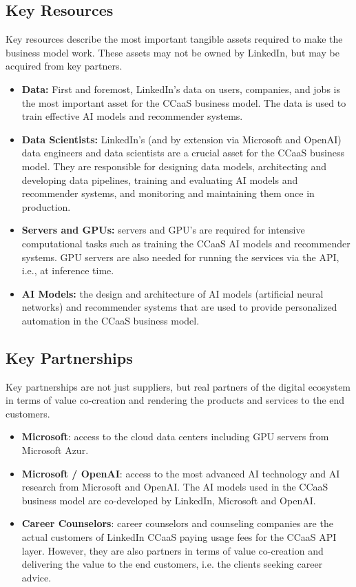 \subsection{Key Resources}

Key resources describe the most important tangible assets required to make the business model work. These
assets may not be owned by LinkedIn, but may be acquired from key partners.

\begin{itemize}
        \item \textbf{Data:} First and foremost, LinkedIn's data on users, companies, and jobs is the most
                important asset for the CCaaS business model. The data is used to train effective AI models
                and recommender systems.
        \item \textbf{Data Scientists:} LinkedIn's (and by extension via Microsoft and OpenAI) data engineers 
                and data scientists are a crucial asset for the CCaaS business model. They are responsible for
                designing data models, architecting and developing data pipelines, training and evaluating
                AI models and recommender systems, and monitoring and maintaining them once in production.
        \item \textbf{Servers and GPUs:} servers and GPU's are required for intensive computational tasks 
                such as training the CCaaS AI models and recommender systems. GPU servers are also needed 
                for running the services via the API, i.e., at inference time.
        \item \textbf{AI Models:} the design and architecture of AI models (artificial neural networks) and
                recommender systems that are used to provide personalized automation in the CCaaS business model.
\end{itemize}

\subsection{Key Partnerships}

Key partnerships are not just suppliers, but real partners of the digital ecosystem in terms of value
co-creation and rendering the products and services to the end customers.

\begin{itemize}
    \item \textbf{Microsoft}: access to the cloud data centers including GPU servers from Microsoft Azur.
    \item \textbf{Microsoft / OpenAI}: access to the most advanced AI technology and AI research
        from Microsoft and OpenAI. The AI models used in the CCaaS business model are co-developed
        by LinkedIn, Microsoft and OpenAI.
    \item \textbf{Career Counselors}: career counselors and counseling companies are the actual customers
        of LinkedIn CCaaS paying usage fees for the CCaaS API layer. However, they are also partners in
        terms of value co-creation and delivering the value to the end customers, i.e. the clients seeking
        career advice. 
\end{itemize}

